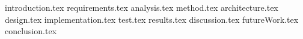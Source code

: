 

{introduction.tex}
{requirements.tex}
{analysis.tex}
{method.tex}
{architecture.tex}
{design.tex}
{implementation.tex}
{test.tex}
{results.tex}
{discussion.tex}
{futureWork.tex}
{conclusion.tex}

%
